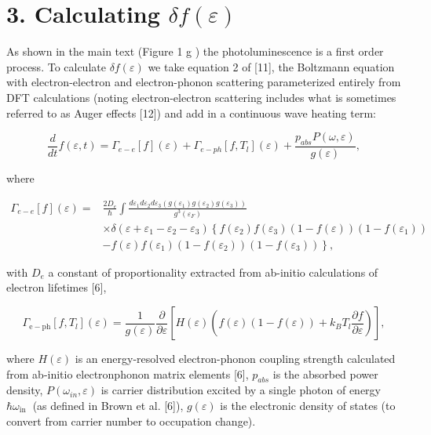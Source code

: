 \documentclass[10pt]{article}
\begin{document}
\section*{3. Calculating $\delta f(\varepsilon)$}
As shown in the main text (Figure 1 g ) the photoluminescence is a first order process. To calculate $\delta f(\varepsilon)$ we take equation 2 of [11], the Boltzmann equation with electron-electron and electron-phonon scattering parameterized entirely from DFT calculations (noting electron-electron scattering includes what is sometimes referred to as Auger effects [12]) and add in a continuous wave heating term:

$$
\frac{d}{d t} f(\varepsilon, t)=\Gamma_{e-e}[f](\varepsilon)+\Gamma_{e-p h}\left[f, T_{l}\right](\varepsilon)+\frac{p_{a b s} P(\omega, \varepsilon)}{g(\varepsilon)},
$$

where

$$
\begin{aligned}
\Gamma_{e-e}[f](\varepsilon)= & \frac{2 D_{e}}{\hbar} \int \frac{d \varepsilon_{1} d \varepsilon_{2} d \varepsilon_{3}\left(g\left(\varepsilon_{1}\right) g\left(\varepsilon_{2}\right) g\left(\varepsilon_{3}\right)\right)}{g^{3}\left(\varepsilon_{F}\right)} \\
& \times \delta\left(\varepsilon+\varepsilon_{1}-\varepsilon_{2}-\varepsilon_{3}\right)\left\{f\left(\varepsilon_{2}\right) f\left(\varepsilon_{3}\right)(1-f(\varepsilon))\left(1-f\left(\varepsilon_{1}\right)\right)\right. \\
& \left.-f(\varepsilon) f\left(\varepsilon_{1}\right)\left(1-f\left(\varepsilon_{2}\right)\right)\left(1-f\left(\varepsilon_{3}\right)\right)\right\},
\end{aligned}
$$

with $D_{e}$ a constant of proportionality extracted from ab-initio calculations of electron lifetimes [6],

$$
\Gamma_{\mathrm{e}-\mathrm{ph}}\left[f, T_{l}\right](\varepsilon)=\frac{1}{g(\varepsilon)} \frac{\partial}{\partial \varepsilon}\left[H(\varepsilon)\left(f(\varepsilon)(1-f(\varepsilon))+k_{B} T_{l} \frac{\partial f}{\partial \varepsilon}\right)\right],
$$

where $H(\varepsilon)$ is an energy-resolved electron-phonon coupling strength calculated from ab-initio electronphonon matrix elements [6], $p_{a b s}$ is the absorbed power density, $P\left(\omega_{i n}, \varepsilon\right)$ is carrier distribution excited by a single photon of energy $\hbar \omega_{\text {in }}$ (as defined in Brown et al. [6]), $g(\varepsilon)$ is the electronic density of states (to convert from carrier number to occupation change).
\end{document}
